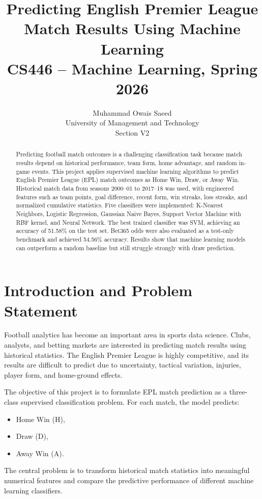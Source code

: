 \documentclass[10pt,a4paper]{article}
\title{\vspace{-1.2cm}\textbf{Predicting English Premier League Match Results Using Machine Learning}\\
\large CS446 -- Machine Learning, Spring 2026}
\author{Muhammad Owais Saeed\\University of Management and Technology\\Section V2}
\date{}
\begin{document}
\maketitle
\vspace{-0.8cm}

\begin{abstract}
Predicting football match outcomes is a challenging classification task because match results depend on historical performance, team form, home advantage, and random in-game events. This project applies supervised machine learning algorithms to predict English Premier League (EPL) match outcomes as Home Win, Draw, or Away Win. Historical match data from seasons 2000--01 to 2017--18 was used, with engineered features such as team points, goal difference, recent form, win streaks, loss streaks, and normalized cumulative statistics. Five classifiers were implemented: K-Nearest Neighbors, Logistic Regression, Gaussian Naive Bayes, Support Vector Machine with RBF kernel, and Neural Network. The best trained classifier was SVM, achieving an accuracy of 51.58\% on the test set. Bet365 odds were also evaluated as a test-only benchmark and achieved 54.56\% accuracy. Results show that machine learning models can outperform a random baseline but still struggle strongly with draw prediction.
\end{abstract}

\section{Introduction and Problem Statement}
Football analytics has become an important area in sports data science. Clubs, analysts, and betting markets are interested in predicting match results using historical statistics. The English Premier League is highly competitive, and its results are difficult to predict due to uncertainty, tactical variation, injuries, player form, and home-ground effects.

The objective of this project is to formulate EPL match prediction as a three-class supervised classification problem. For each match, the model predicts:
\begin{itemize}
    \item Home Win (H),
    \item Draw (D),
    \item Away Win (A).
\end{itemize}
The central problem is to transform historical match statistics into meaningful numerical features and compare the predictive performance of different machine learning classifiers.
\end{document}
